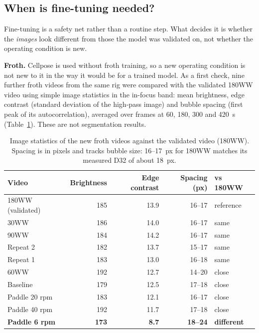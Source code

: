 \subsection{When is fine-tuning needed?}\label{when-finetune}

Fine-tuning is a safety net rather than a routine step. What decides it
is whether the \emph{images} look different from those the model was
validated on, not whether the operating condition is new.

\textbf{Froth.} Cellpose is used without froth training, so a new
operating condition is not new to it in the way it would be for a trained
model. As a first check, nine further froth videos from the same rig were
compared with the validated 180WW video using simple image statistics in
the in-focus band: mean brightness, edge contrast (standard deviation of
the high-pass image) and bubble spacing (first peak of its
autocorrelation), averaged over frames at 60, 180, 300 and 420~s
(Table~\ref{tab:newfroth}). These are not segmentation results.

\begin{table}[htbp]
\centering
\small
\caption{Image statistics of the new froth videos against the validated
video (180WW). Spacing is in pixels and tracks bubble size: 16--17~px for
180WW matches its measured D32 of about 18~px.}
\label{tab:newfroth}
\begin{tabular}{@{}lrrrl@{}}
\toprule
Video & Brightness & Edge contrast & Spacing (px) & vs 180WW \\
\midrule
180WW (validated) & 185 & 13.9 & 16--17 & reference \\
30WW & 186 & 14.0 & 16--17 & same \\
90WW & 184 & 14.2 & 16--17 & same \\
Repeat 2 & 182 & 13.7 & 15--17 & same \\
Repeat 1 & 183 & 13.0 & 16--18 & same \\
60WW & 192 & 12.7 & 14--20 & close \\
Baseline & 179 & 12.5 & 17--18 & close \\
Paddle 20 rpm & 183 & 12.1 & 16--17 & close \\
Paddle 40 rpm & 192 & 11.7 & 17--18 & close \\
\textbf{Paddle 6 rpm} & \textbf{173} & \textbf{8.7} & \textbf{18--24} & \textbf{different} \\
\bottomrule
\end{tabular}
\end{table}

